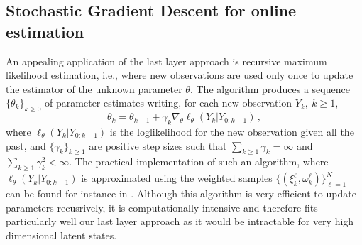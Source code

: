 \documentclass[journal]{IEEEtran}
\begin{document}

\subsection{Stochastic Gradient Descent for online estimation}
An appealing application of the last layer approach is recursive maximum likelihood estimation, i.e., where new observations are used only once to update the estimator of the unknown parameter $\theta$. The algorithm produces a sequence $\lbrace\theta_k\rbrace_{k\geq 0}$ of parameter estimates writing, for each new observation $Y_{k},~k\geq 1$,
$$
	\theta_{k} = \theta_{k-1} + \gamma_k \nabla_\theta \ell_{\theta}(Y_k | Y_{0:k - 1}) \,,
$$
where $\ell_{\theta}(Y_k | Y_{0:k - 1})$ is the loglikelihood for the new observation given all the past, and $\lbrace\gamma_k\rbrace_{k\geq 1}$ are positive step sizes such that $\sum_{k \geq 1}\gamma_k = \infty$ and $\sum_{k \geq 1}\gamma_k^2 < \infty$. The practical implementation of such an algorithm, where $\ell_{\theta}(Y_k | Y_{0:k - 1})$ is approximated using the weighted samples $\{(\xi^{\ell}_k,\omega^{\ell}_k)\}_{\ell=1}^N$ can be found for instance in \cite{}. Although this algorithm is very efficient to update parameters recusrively, it is computationally intensive and therefore fits particularly well our last layer approach as it would be intractable for very high dimensional latent states.
\end{document}
